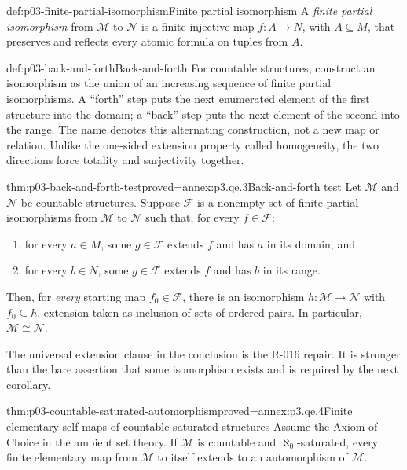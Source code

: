 \begin{hbdefinition}{def:p03-finite-partial-isomorphism}{Finite partial isomorphism}
A \emph{finite partial isomorphism} from \(\mathcal M\) to \(\mathcal N\) is a
finite injective map \(f:A\to N\), with \(A\subseteq M\), that preserves and
reflects every atomic formula on tuples from \(A\).
\end{hbdefinition}

\begin{hbmethod}{def:p03-back-and-forth}{Back-and-forth}
For countable structures, construct an isomorphism as the union of an
increasing sequence of finite partial isomorphisms.  A ``forth'' step puts the
next enumerated element of the first structure into the domain; a ``back'' step
puts the next element of the second into the range.  The name denotes this
alternating construction, not a new map or relation.  Unlike the one-sided
extension property called homogeneity, the two directions force totality and
surjectivity together.
\end{hbmethod}

\begin{hbtheorem}{thm:p03-back-and-forth-test}{proved=annex:p3.qe.3}{Back-and-forth test}
Let \(\mathcal M\) and \(\mathcal N\) be countable structures.  Suppose
\(\mathcal F\) is a nonempty set of finite partial isomorphisms from
\(\mathcal M\) to \(\mathcal N\) such that, for every \(f\in\mathcal F\):
\begin{enumerate}
  \item for every \(a\in M\), some \(g\in\mathcal F\) extends \(f\) and has
        \(a\) in its domain; and
  \item for every \(b\in N\), some \(g\in\mathcal F\) extends \(f\) and has
        \(b\) in its range.
\end{enumerate}
Then, for \emph{every} starting map \(f_0\in\mathcal F\), there is an
isomorphism \(h:\mathcal M\to\mathcal N\) with \(f_0\subseteq h\), extension
taken as inclusion of sets of ordered pairs.  In particular,
\(\mathcal M\cong\mathcal N\).
\end{hbtheorem}

The universal extension clause in the conclusion is the R-016 repair.  It is
stronger than the bare assertion that some isomorphism exists and is required
by the next corollary.

\begin{hbcorollary}{thm:p03-countable-saturated-automorphism}{proved=annex:p3.qe.4}{Finite elementary self-maps of countable saturated structures}
Assume the Axiom of Choice in the ambient set theory.  If \(\mathcal M\) is
countable and \(\aleph_0\)-saturated, every finite elementary map from
\(\mathcal M\) to itself extends to an automorphism of \(\mathcal M\).
\end{hbcorollary}

